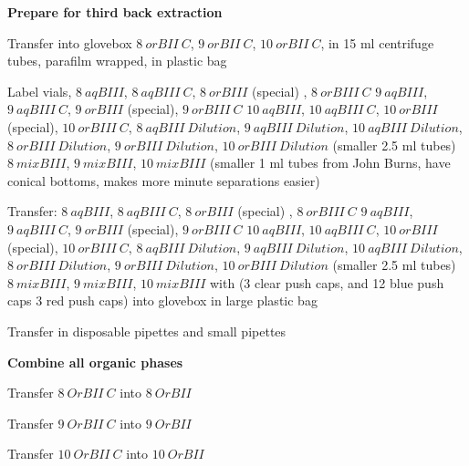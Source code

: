 \documentclass[idxtotoc,hyperref,openany,oneside]{labbook} %
\newcommand{\cmark}{\ding{51}}%
\newcommand{\done}{\rlap{$\square$}{\raisebox{2pt}{\large\hspace{1pt}\cmark}}%
  \hspace{-2.5pt}}
\begin{document}
\textbf{Prepare for third back extraction}
\begin{todolist}
\item[\done]{Transfer into glovebox $\boxed{8\ orBII\ C}$,
  $\boxed{9\ orBII\ C}$, $\boxed{10\ orBII\ C}$,
  in 15 ml centrifuge tubes, parafilm wrapped, in plastic bag}
\item[\done]{Label vials,
  $\boxed{8\ aqBIII}$,
  $\boxed{8\ aqBIII\ C}$,  $\boxed{8\ orBIII}$ (special) \smiley,
  $\boxed{8\ orBIII\ C}$
  $\boxed{9\ aqBIII}$,
  $\boxed{9\ aqBIII\ C}$,  $\boxed{9\ orBIII}$ (special),
  $\boxed{9\ orBIII\ C}$
  $\boxed{10\ aqBIII}$, $\boxed{10\ aqBIII\ C}$,
  $\boxed{10\ orBIII}$ (special),
  $\boxed{10\ orBIII\ C}$,
  $\boxed{8\ aqBIII\ Dilution}$,
  $\boxed{9\ aqBIII\ Dilution}$,
  $\boxed{10\ aqBIII\ Dilution}$,
  $\boxed{8\ orBIII\ Dilution}$,
  $\boxed{9\ orBIII\ Dilution}$,
  $\boxed{10\ orBIII\ Dilution}$ (smaller 2.5 ml tubes)
  $\boxed{8\ mixBIII}$, $\boxed{9\ mixBIII}$,
    $\boxed{10\ mixBIII}$ (smaller 1 ml tubes from John Burns,
    have conical bottoms, makes more minute separations easier)}

\item[\done]{Transfer:   $\boxed{8\ aqBIII}$,
  $\boxed{8\ aqBIII\ C}$,  $\boxed{8\ orBIII}$ (special) \smiley,
  $\boxed{8\ orBIII\ C}$
  $\boxed{9\ aqBIII}$,
  $\boxed{9\ aqBIII\ C}$,  $\boxed{9\ orBIII}$ (special),
  $\boxed{9\ orBIII\ C}$
  $\boxed{10\ aqBIII}$, $\boxed{10\ aqBIII\ C}$,
  $\boxed{10\ orBIII}$ (special),
  $\boxed{10\ orBIII\ C}$,
  $\boxed{8\ aqBIII\ Dilution}$,
  $\boxed{9\ aqBIII\ Dilution}$,
  $\boxed{10\ aqBIII\ Dilution}$,
  $\boxed{8\ orBIII\ Dilution}$,
  $\boxed{9\ orBIII\ Dilution}$,
  $\boxed{10\ orBIII\ Dilution}$ (smaller 2.5 ml tubes)
  $\boxed{8\ mixBIII}$, $\boxed{9\ mixBIII}$,
    $\boxed{10\ mixBIII}$
  with
  (3 clear push caps, and 12 blue push caps
  3 red push caps) into glovebox in large plastic bag}
\item[\done]{Transfer in disposable pipettes and small pipettes}
\end{todolist}
\textbf{Combine all organic phases}

\begin{todolist}  
\item[\done]{Transfer $\boxed{8\ OrBII\ C}$ into $\boxed{8\ OrBII}$}
\item[\done]{Transfer $\boxed{9\ OrBII\ C}$ into $\boxed{9\ OrBII}$}
\item[\done]{Transfer $\boxed{10\ OrBII\ C}$ into $\boxed{10\ OrBII}$}
\end{todolist}
  
\end{document}
